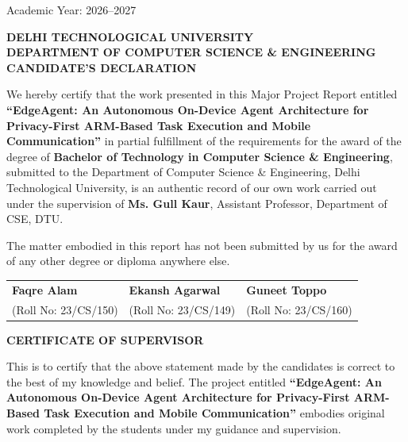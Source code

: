 \documentclass[12pt,a4paper,oneside]{report}
\begin{document}
\begin{titlepage}
\begin{center}
    \vfill
    {\large Academic Year: 2026--2027}
\end{center}
\end{titlepage}

\newpage
\thispagestyle{plain}
\begin{center}
    {\Large \textbf{DELHI TECHNOLOGICAL UNIVERSITY}}\\[0.2cm]
    {\large \textbf{DEPARTMENT OF COMPUTER SCIENCE \& ENGINEERING}}\\[1.5cm]
    {\LARGE \textbf{CANDIDATE'S DECLARATION}}\\[1.0cm]
\end{center}

We hereby certify that the work presented in this Major Project Report entitled \textbf{``EdgeAgent: An Autonomous On-Device Agent Architecture for Privacy-First ARM-Based Task Execution and Mobile Communication''} in partial fulfillment of the requirements for the award of the degree of \textbf{Bachelor of Technology in Computer Science \& Engineering}, submitted to the Department of Computer Science \& Engineering, Delhi Technological University, is an authentic record of our own work carried out under the supervision of \textbf{Ms. Gull Kaur}, Assistant Professor, Department of CSE, DTU.

The matter embodied in this report has not been submitted by us for the award of any other degree or diploma anywhere else.

\vspace{2.0cm}

\noindent
\begin{tabular}{p{5.5cm}p{5.5cm}p{5.5cm}}
\textbf{Faqre Alam} & \textbf{Ekansh Agarwal} & \textbf{Guneet Toppo}\\
(Roll No: 23/CS/150) & (Roll No: 23/CS/149) & (Roll No: 23/CS/160)
\end{tabular}

\vspace{1.5cm}

\begin{center}
    {\Large \textbf{CERTIFICATE OF SUPERVISOR}}\\[0.5cm]
\end{center}

This is to certify that the above statement made by the candidates is correct to the best of my knowledge and belief. The project entitled \textbf{``EdgeAgent: An Autonomous On-Device Agent Architecture for Privacy-First ARM-Based Task Execution and Mobile Communication''} embodies original work completed by the students under my guidance and supervision.
\end{document}
